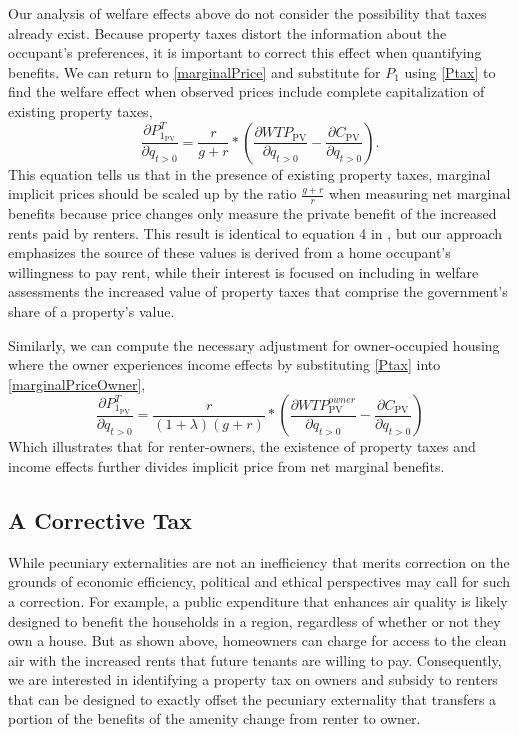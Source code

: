 \documentclass[ecta,nameyear,draft]{econsocart}
\theoremstyle{plain}
\theoremstyle{remark}
\begin{document}
Our analysis of welfare effects above do not consider the possibility that taxes already exist. Because property taxes distort the information about the occupant's preferences, it is important to correct this effect when quantifying benefits. We can return to \ref{marginalPrice} and substitute for $P_1$ using \ref{Ptax} to find the welfare effect when observed prices include complete capitalization of existing property taxes,
\begin{equation}
\frac{\partial P^T_{1_{\mathrm{PV}}}} {\partial q_{t>0}}=\frac{r}{g+r}*\left(\frac{\partial \mathit{WTP}_{\mathrm{PV}}}{\partial q_{t>0}}-\frac{\partial C_{\mathrm{PV}}}{\partial q_{t>0}}\right). \label{marginalPriceT}
\end{equation}
This equation tells us that in the presence of existing property taxes, marginal implicit prices should be scaled up by the ratio $\frac{g+r}{r}$ when measuring net marginal benefits because price changes only measure the private benefit of the increased rents paid by renters. This result is identical to equation 4 in \cite{niskanen77}, but our approach emphasizes the source of these values is derived from a home occupant's willingness to pay rent, while their interest is focused on including in welfare assessments the increased value of property taxes that comprise the government's share of a property's value.

Similarly, we can compute the necessary adjustment for owner-occupied housing where the owner experiences income effects by substituting \ref{Ptax} into \ref{marginalPriceOwner},
\begin{equation}
\frac{\partial P^T_{1_{\mathrm{PV}}}} {\partial q_{t>0}}=\frac{r}{(1+\lambda)(g+r)}*\left(
\frac{\partial \mathit{WTP}^{\mathit{owner}}_{\mathrm{PV}}}{\partial q_{t>0}}-\frac{\partial C_{\mathrm{PV}}}{\partial q_{t>0}}\right) \label{marginalPriceOwnerT}
\end{equation}
Which illustrates that for renter-owners, the existence of property taxes and income effects further divides implicit price from net marginal benefits.

\subsection{A Corrective Tax}
While pecuniary externalities are not an inefficiency that merits correction on the grounds of economic efficiency, political and ethical perspectives may call for such a correction. For example, a public expenditure that enhances air quality is likely designed to benefit the households in a region, regardless of whether or not they own a house. But as shown above, homeowners can charge for access to the clean air with the increased rents that future tenants are willing to pay. Consequently, we are interested in identifying a property tax on owners and subsidy to renters that can be designed to exactly offset the pecuniary externality that transfers a portion of the benefits of the amenity change from renter to owner. 
\end{document}
